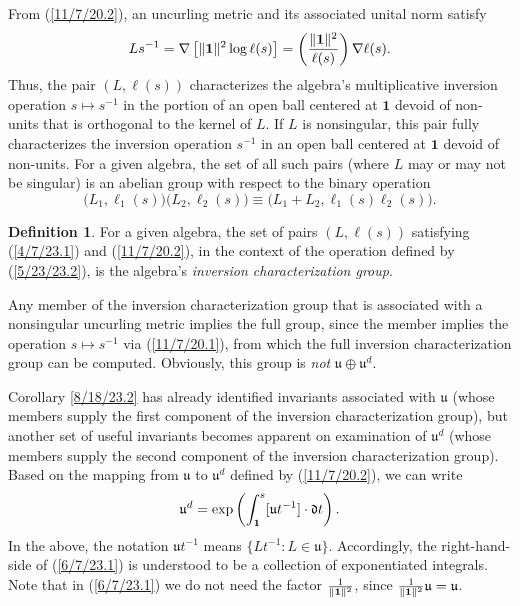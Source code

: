 \documentclass{amsart}
\numberwithin{equation}{section}
\theoremstyle{definition}
\newtheorem{definition}[theorem]{Definition}
\numberwithin{theorem}{section}
\begin{document}
  
    From (\ref{11/7/20.2}), an uncurling metric and its associated unital norm satisfy  \begin{equation}\label{11/7/20.1} Ls^{-1}  = \nabla\left[\|{\bf 1}\|^2\log  \ell(s)\right] =   \left(\frac{\|{\bf 1}\|^2}{ \ell(s)}\right)\nabla \ell(s).\end{equation} 
Thus, the pair $(L, \ell(s))$ characterizes the algebra's multiplicative inversion operation $s\mapsto s^{-1}$ in the portion of an open ball centered at $\mathbf{1}$ devoid of non-units that is orthogonal to the kernel of $L$.  If $L$ is nonsingular, this pair fully characterizes the inversion operation $s^{-1}$ in an open ball centered at $\mathbf{1}$ devoid of non-units.  For a given algebra, the set of all such pairs (where $L$ may or may not be singular) is an abelian group with respect to the binary operation 
\begin{equation}\label{5/23/23.2} \big(L_1, \ell_1(s)\big)\big(L_2, \ell_2(s)\big) \equiv 
\big(L_1+L_2, \ell_1(s)  \ell_2(s)\big).\end{equation} 
\begin{definition} For a given algebra, the set of pairs $(L, \ell(s))$ satisfying (\ref{4/7/23.1}) and (\ref{11/7/20.2}), in the context of the operation defined by (\ref{5/23/23.2}), is the algebra's {\it inversion characterization group}. \end{definition}

Any member of the inversion characterization group that is associated with a nonsingular uncurling metric implies the full group, since the member implies the operation $s\mapsto s^{-1}$ via (\ref{11/7/20.1}), from which the full inversion characterization group can be computed.  Obviously, this group is {\it not} $\mathfrak{u}\oplus\mathfrak{u}^d$. 

Corollary \ref{8/18/23.2} has already identified invariants associated with $\mathfrak{u}$ (whose members supply the first component of the inversion characterization group), but another set of useful invariants becomes apparent on examination of $\mathfrak{u}^d$ (whose members supply the second component of the inversion characterization group).  Based on the mapping from $\mathfrak{u}$ to $\mathfrak{u}^d$ defined by (\ref{11/7/20.2}),  we can write \begin{equation}  \mathfrak{u}^d = \exp\left(\int_{\bf 1}^s [\mathfrak{u}t^{-1}]\cdot \mathfrak{d}t\right). \label{6/7/23.1}\end{equation}  In the above, the notation $\mathfrak{u}t^{-1}$ means $\{Lt^{-1}: L\in \mathfrak{u}\}$.  Accordingly, the right-hand-side of (\ref{6/7/23.1}) is understood to be a collection of exponentiated integrals.   Note that in (\ref{6/7/23.1}) we do not need the factor $\frac{1}{\|{\bf 1}\|^2}$, since $\frac{1}{\|{\bf 1}\|^2}\mathfrak{u}=\mathfrak{u}$.  
\end{document}
